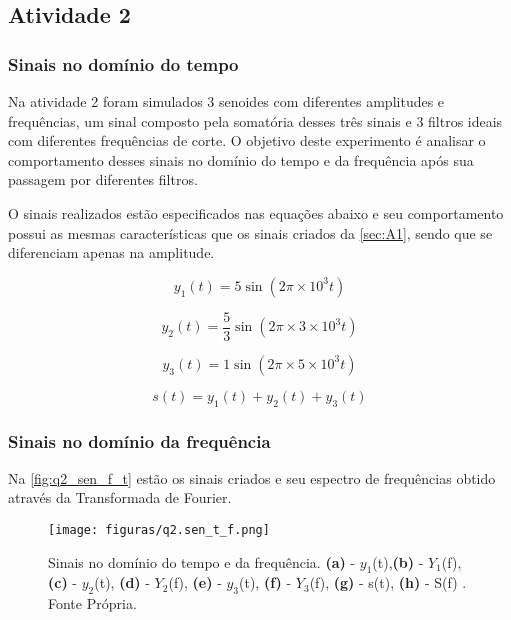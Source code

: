 \documentclass[11pt]{classes/ifscarticle}
\begin{document}
\subsection{Atividade 2}
\label{sec:A2}

\subsubsection{Sinais no domínio do tempo}

Na atividade 2 foram simulados 3 senoides com diferentes amplitudes e frequências, um sinal composto pela somatória desses três sinais e 3 filtros ideais com diferentes frequências de corte. O objetivo deste experimento é analisar o comportamento desses sinais no domínio do tempo e da frequência após sua passagem por diferentes filtros.

O sinais realizados estão especificados nas equações abaixo e seu comportamento possui as mesmas características que os sinais criados da \autoref{sec:A1}, sendo que se diferenciam apenas na amplitude.

 \begin{equation}
     y_1(t) = 5 \sin (2\pi\times10^3t)
     \label{eq:q2_y1}
 \end{equation}

 \begin{equation}
     y_2(t) = \frac{5}{3} \sin (2\pi\times3\times10^3t)
     \label{eq:q2_y2}
 \end{equation}
 
  \begin{equation}
     y_3(t) = 1 \sin (2\pi\times5\times10^3t)
     \label{eq:q2_y3}
 \end{equation}
 
  \begin{equation}
     s(t) = y_1(t) + y_2(t) + y_3(t)
     \label{eq:q2_s_t}
 \end{equation}

\subsubsection{Sinais no domínio da frequência}
Na \autoref{fig:q2_sen_f_t} estão os sinais criados e seu espectro de frequências obtido através da Transformada de Fourier.

\begin{figure}[ht]
    \centering
    \texttt{[image: figuras/q2.sen\_t\_f.png]}
    \caption{Sinais no domínio do tempo e da frequência. \textbf{(a)} - $y_1$(t),\textbf{(b)} - $Y_1$(f), \textbf{(c)}  - $y_2$(t), \textbf{(d)}  - $Y_2$(f), \textbf{(e)}  - $y_3$(t),  \textbf{(f)}  - $Y_3$(f), \textbf{(g)} - s(t), \textbf{(h)} - S(f) . Fonte Própria.}
    \label{fig:q2_sen_f_t}
\end{figure}
\end{document}
